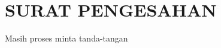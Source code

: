 



\newpage


\newpage
\frontmatter %
\fancyhead{} %
\fancyfoot[C]{\thepage} %



\newpage
\chapter*{SURAT PENGESAHAN}
Masih proses minta tanda-tangan
%





\newpage
\tableofcontents

\newpage
\listoffigures

\newpage
\listoftables

\newpage
\mainmatter
\fancyhead[R]{\thepage}  %
\fancyfoot{} %

{
\linespread{2}
\selectfont





}

\newpage






